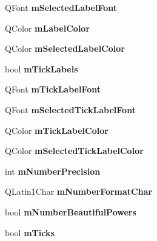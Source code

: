 \begin{DoxyCompactItemize}
Q\+Font {\bfseries m\+Selected\+Label\+Font}
\item 
\mbox{\label{class_q_c_p_axis_a457a003bb1c2b6ab73e5a173ba7558fd}} 
Q\+Color {\bfseries m\+Label\+Color}
\item 
\mbox{\label{class_q_c_p_axis_a94f57de3ba024471ca206d83cf2258dd}} 
Q\+Color {\bfseries m\+Selected\+Label\+Color}
\item 
\mbox{\label{class_q_c_p_axis_a3e4315be072026644e69009557a2fa11}} 
bool {\bfseries m\+Tick\+Labels}
\item 
\mbox{\label{class_q_c_p_axis_add79d1e39c4ed65869a1e9cc79043f3f}} 
Q\+Font {\bfseries m\+Tick\+Label\+Font}
\item 
\mbox{\label{class_q_c_p_axis_a4f2e4919da9615dac612662c249b1119}} 
Q\+Font {\bfseries m\+Selected\+Tick\+Label\+Font}
\item 
\mbox{\label{class_q_c_p_axis_a6384a749b3b56a97df081d8082321ab4}} 
Q\+Color {\bfseries m\+Tick\+Label\+Color}
\item 
\mbox{\label{class_q_c_p_axis_a3bcad40902f45dc4c991a2c3e4d31d70}} 
Q\+Color {\bfseries m\+Selected\+Tick\+Label\+Color}
\item 
\mbox{\label{class_q_c_p_axis_acd76e8c783384d99ccc4a13797eec188}} 
int {\bfseries m\+Number\+Precision}
\item 
\mbox{\label{class_q_c_p_axis_a39594313deef458f425bba25cd337a8a}} 
Q\+Latin1\+Char {\bfseries m\+Number\+Format\+Char}
\item 
\mbox{\label{class_q_c_p_axis_af03809bee3f3e35fcc38d25b6dd5003b}} 
bool {\bfseries m\+Number\+Beautiful\+Powers}
\item 
\mbox{\label{class_q_c_p_axis_ab111e74bba22e06848897c932fc549fe}} 
bool {\bfseries m\+Ticks}
\item 
\mbox{\label{class_q_c_p_axis_af16aab9c3effa482fa10e7dd5c3d91f3}} 

\end{DoxyCompactItemize}
